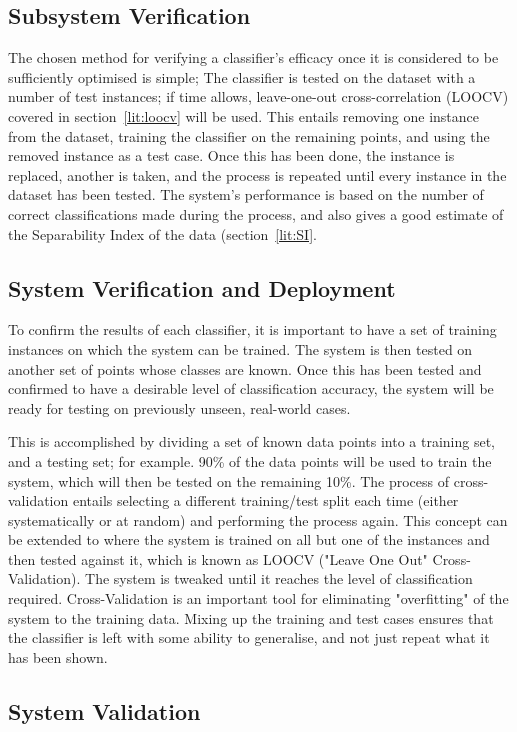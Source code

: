\subsection{Subsystem Verification}
The chosen method for verifying a classifier's efficacy once it is considered to be sufficiently optimised is simple; The classifier is tested on the dataset with a number of test instances; if time allows, leave-one-out cross-correlation (LOOCV) covered in section~\ref{lit:loocv} will be used. This entails removing one instance from the dataset, training the classifier on the remaining points, and using the removed instance as a test case. Once this has been done, the instance is replaced, another is taken, and the process is repeated until every instance in the dataset has been tested. The system's performance is based on the number of correct classifications made during the process, and also gives a good estimate of the Separability Index of the data (section~\ref{lit:SI}. 


\subsection{System Verification and Deployment}
To confirm the results of each classifier, it is important to have a set of training instances on which the system can be trained. The system is then tested on another set of points whose classes are known. Once this has been tested and confirmed to have a desirable level of classification accuracy, the system will be ready for testing on previously unseen, real-world cases. 

This is accomplished by dividing a set of known data points into a training set, and a testing set; for example. 90\% of the data points will be used to train the system, which will then be tested on the remaining 10\%. The process of cross-validation entails selecting a different training/test split each time (either systematically or at random) and performing the process again. This concept can be extended to where the system is trained on all but one of the instances and then tested against it, which is known as LOOCV ("Leave One Out" Cross-Validation). The system is tweaked until it reaches the level of classification required. Cross-Validation is an important tool for eliminating "overfitting" of the system to the training data. Mixing up the training and test cases ensures that the classifier is left with some ability to generalise, and not just repeat what it has been shown.

\subsection{System Validation}
